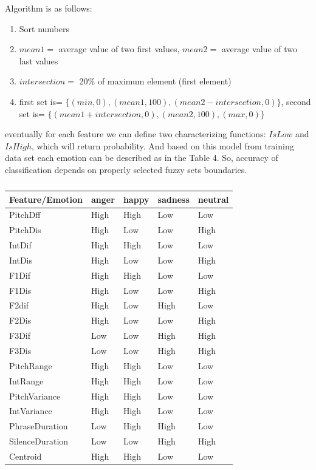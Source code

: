 \documentclass[12pt, letterpaper]{article}
\begin{document}
Algorithm is as follows:

\begin{enumerate}
	\item Sort numbers
	\item $mean1=$ average value of two first values, $mean2=$ average value of two last values
	\item $intersection=$ 20\% of maximum element (first element)
	\item first set is= $\{ (min,0) , (mean1, 100) , (mean2-intersection, 0) \}$, second set is= $\{ (mean1+intersection, 0), (mean2, 100) , (max, 0) \}$
\end{enumerate}

eventually for each feature we can define two characterizing functions: $IsLow$ and $IsHigh$, which will return probability. And based on this model from training data set each emotion can be described as in the Table 4. So, accuracy of classification depends on properly selected fuzzy sets boundaries.
\begin{table}[h]
	\centering
		\begin{tabular}{l|l|l|l|l|}
			\hline
				Feature/Emotion& anger&	happy	&sadness	&neutral\\ \hline
PitchDff&	High	&High	&Low	&Low\\ \hline 
PitchDis&	High	&Low&	Low&	High\\ \hline
IntDif&	High&	High&	Low&	Low\\ \hline
IntDis	&High	&Low&	Low&	High\\ \hline
F1Dif&	High&	High&	Low&	Low\\ \hline
F1Dis&	High	&Low&	Low&	High\\ \hline
F2dif	&High&	Low&	High&	Low\\ \hline
F2Dis&	High&	Low&	Low	&High\\ \hline
F3Dif&	Low&	Low&	High&	High\\ \hline
F3Dis&	Low	&Low&	High&	High\\ \hline
PitchRange&	High&	High&Low&	Low\\ \hline
IntRange&	High&	High&	Low&	Low\\ \hline
PitchVariance&	High&	High&Low&	Low\\ \hline
IntVariance	&High&	High&	Low	&Low\\ \hline
PhraseDuration&	Low&	High&	High	&Low\\ \hline
SilenceDuration	&Low	&Low	&High&	High\\ \hline
Centroid&	High	&High&	Low&	Low\\ \hline
 \hline
		\end{tabular}
	\caption{}
	\label{tab:}
\end{table}
\end{document}
